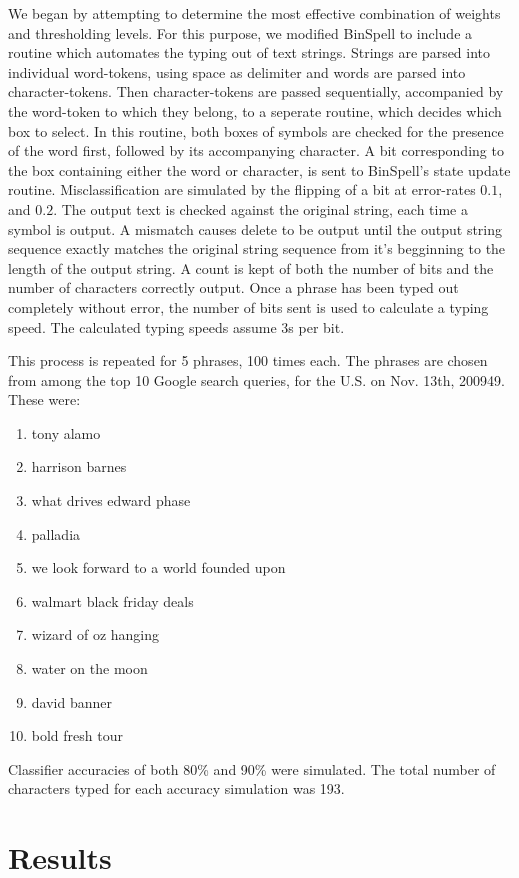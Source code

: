 \documentclass[12pt,titlepage]{article}
\begin{document}
We began by attempting to determine the most effective combination of weights and 
thresholding levels.  For this purpose, we modified BinSpell to include a routine which 
automates the typing out of text strings.  Strings are parsed  into individual word-tokens, using 
space as delimiter and words are parsed into character-tokens.  Then character-tokens are 
passed sequentially, accompanied by the word-token to which they belong, to a seperate routine, which decides which box to select.  In this routine, both boxes of 
symbols are checked for the presence of the word first, followed by its accompanying 
character.  A bit corresponding to the box containing either the word or character, is sent to BinSpell's state update routine. 
Misclassification are simulated by the flipping of a bit at error-rates $0.1$, and $0.2$.  The output text is checked against the original string, each time a symbol is output.  A mismatch causes delete to be output until the output string sequence exactly matches the original string sequence from it's begginning to the length of the output string.  A count is 
kept of both the number of bits and the number of characters correctly output.  Once a phrase 
has been typed out completely without error, the number of bits sent is used to calculate a 
typing speed.  The calculated typing speeds assume 3s per bit.

This process is repeated for 5 phrases, 100 times each.  The phrases are chosen from  among 
the top 10 Google search queries, for the  U.S. on Nov. 13th, 200949.  These were: 
\begin{enumerate}
\item tony alamo 
\item harrison barnes 
\item what drives edward phase 
\item palladia 
\item we look forward to a world founded upon 
\item walmart black friday deals 
\item wizard of oz hanging 
\item water on the moon 
\item david banner 
\item bold fresh tour
\end{enumerate}

Classifier accuracies of both 80\% and 90\% were simulated.  The total number of characters 
typed for each accuracy simulation was 193.

\section{Results}
\end{document}
